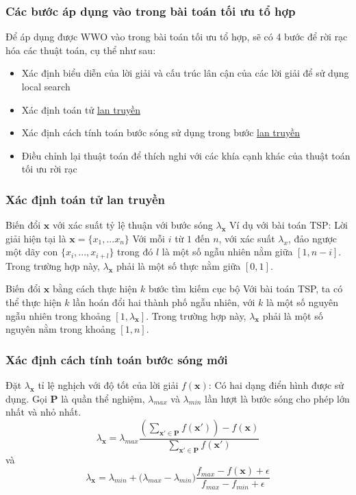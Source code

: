 \begin{frame}
    \frametitle{Các bước áp dụng vào trong bài toán tối ưu tổ hợp}
    Để áp dụng được WWO vào trong bài toán tối ưu tổ hợp, sẽ có 4 bước để rời rạc hóa các thuật toán, cụ thể như sau:
    \begin{itemize}
        \item Xác định biểu diễn của lời giải và cấu trúc lân cận của các lời giải để sử dụng local search
        \item Xác định toán tử \hyperlink{frame:propagation}{lan truyền}
        \item Xác định cách tính toán bước sóng sử dụng trong bước \hyperlink{frame:propagation}{lan truyền}
        \item Điều chỉnh lại thuật toán để thích nghi với các khía cạnh khác của thuật toán tối ưu rời rạc
    \end{itemize}
\end{frame}


\begin{frame}
    \frametitle{Xác định toán tử lan truyền}
    \begin{block}{Biến đổi $\mathbf{x}$ với xác suất tỷ lệ thuận với bước sóng $\lambda_{\mathbf{x}}$}
        Ví dụ với bài toán TSP: Lời giải hiện tại là $\mathbf{x} = \{x_1, ... x_n\}$
Với mỗi $i$ từ $1$ đến $n$, với xác suất $\lambda_{x}$, đảo ngược một dãy con $\{x_i, ..., x_{i + l}\}$ trong đó $l$ là một số ngẫu nhiên nằm giữa $[1, n - i]$. Trong trường hợp này, $\lambda_\mathbf{x}$ phải là một số thực nằm giữa $[0, 1]$.
    \end{block}
    \begin{block}{Biến đổi $\mathbf{x}$ bằng cách thực hiện $k$ bước tìm kiếm cục bộ}
        Với bài toán TSP, ta có thể thực hiện $k$ lần hoán đổi hai thành phố ngẫu nhiên, với $k$ là một số nguyên ngẫu nhiên trong khoảng $[1, \lambda_\mathbf{x}]$. Trong trường hợp này, $\lambda_\mathbf{x}$ phải là một số nguyên nằm trong khoảng $[1, n]$.
    \end{block}
\end{frame}


\begin{frame}
    \frametitle{Xác định cách tính toán bước sóng mới}
    \begin{block}{Đặt $\lambda_{\mathbf{x}}$ tỉ lệ nghịch với độ tốt của lời giải $f(\mathbf{x})$:}
        Có hai dạng điển hình được sử dụng. Gọi $\mathbf{P}$ là quần thể nghiệm, $\lambda_{max}$ và $\lambda_{min}$ lần lượt là bước sóng cho phép lớn nhất và nhỏ nhất.
        \begin{equation}
            \label{eq:e3}
            \lambda_{\mathbf{x}}=\lambda_{max}\frac{(\sum_{\mathbf{x'}\in\mathbf{P}}f(\mathbf{x}'))-f(\mathbf{x})}{\sum_{\mathbf{x'}\in\mathbf{P}}f(\mathbf{x}')}
        \end{equation}
        và
        \begin{equation}
            \label{eq:e4}
            \lambda_{\mathbf{x}} = \lambda_{min} + ({\lambda_{max} - \lambda_{min})\frac{f_{max} - f(\mathbf{x}) + \epsilon}{f_{max} - f_{min} + \epsilon}}
        \end{equation}
    \end{block}
\end{frame}

